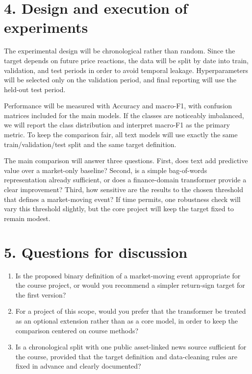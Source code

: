 \documentclass[11pt]{article}
\begin{document}
\section*{4. Design and execution of experiments}
The experimental design will be chronological rather than random. Since the target depends on future price reactions, the data will be split by date into train, validation, and test periods in order to avoid temporal leakage. Hyperparameters will be selected only on the validation period, and final reporting will use the held-out test period.

Performance will be measured with Accuracy and macro-F1, with confusion matrices included for the main models. If the classes are noticeably imbalanced, we will report the class distribution and interpret macro-F1 as the primary metric. To keep the comparison fair, all text models will use exactly the same train/validation/test split and the same target definition.

The main comparison will answer three questions. First, does text add predictive value over a market-only baseline? Second, is a simple bag-of-words representation already sufficient, or does a finance-domain transformer provide a clear improvement? Third, how sensitive are the results to the chosen threshold that defines a market-moving event? If time permits, one robustness check will vary this threshold slightly, but the core project will keep the target fixed to remain modest.

\section*{5. Questions for discussion}
\begin{enumerate}[leftmargin=1.5em]
\item Is the proposed binary definition of a market-moving event appropriate for the course project, or would you recommend a simpler return-sign target for the first version?
\item For a project of this scope, would you prefer that the transformer be treated as an optional extension rather than as a core model, in order to keep the comparison centered on course methods?
\item Is a chronological split with one public asset-linked news source sufficient for the course, provided that the target definition and data-cleaning rules are fixed in advance and clearly documented?
\end{enumerate}
\end{document}
